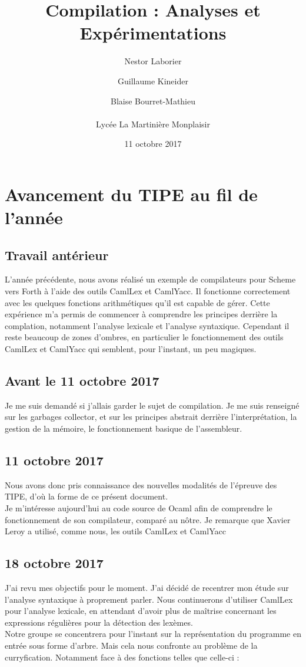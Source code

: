 \documentclass{report}
\title{Compilation : Analyses et Expérimentations}
\author{\bsc Nestor Laborier \and \bsc Guillaume Kineider \and \bsc Blaise Bourret-Mathieu \\ \\ Lycée La Martinière Monplaisir}
\date{11 octobre 2017}
\begin{document}
\maketitle


\chapter{Avancement du TIPE au fil de l'année}

\section{Travail antérieur}
L'année précédente, nous avons réalisé un exemple de compilateurs pour Scheme vers Forth à l'aide des outils CamlLex et CamlYacc. Il fonctionne correctement avec les quelques fonctions arithmétiques qu'il est capable de gérer. Cette expérience m'a permis de commencer à comprendre les principes derrière la complation, notamment l'analyse lexicale et l'analyse syntaxique.
Cependant il reste beaucoup de zones d'ombres, en particulier le fonctionnement des outils CamlLex et CamlYacc qui semblent, pour l'instant, un peu magiques.

\section{Avant le 11 octobre 2017}
Je me suis demandé si j'allais garder le sujet de compilation. Je me suis renseigné sur les garbages collector, et sur les principes abstrait derrière l'interprétation, la gestion de la mémoire, le fonctionnement basique de l'assembleur.

\section{11 octobre 2017}
Nous avons donc pris connaissance des nouvelles modalités de l'épreuve des TIPE, d'où la forme de ce présent document.\\
Je m'intéresse aujourd'hui au code source de Ocaml afin de comprendre le fonctionnement de son compilateur, comparé au nôtre. Je remarque que Xavier Leroy a utilisé, comme nous, les outils CamlLex et CamlYacc

\section{18 octobre 2017}
J'ai revu mes objectifs pour le moment. J'ai décidé de recentrer mon étude sur l'analyse syntaxique à proprement parler. Nous continuerons d'utiliser CamlLex pour l'analyse lexicale, en attendant d'avoir plus de maîtrise concernant les expressions régulières pour la détection des lexèmes.\\
Notre groupe se concentrera pour l'instant sur la représentation du programme en entrée sous forme d'arbre. Mais cela nous confronte au problème de la curryfication. Notamment face à des fonctions telles que celle-ci :
\end{document}
